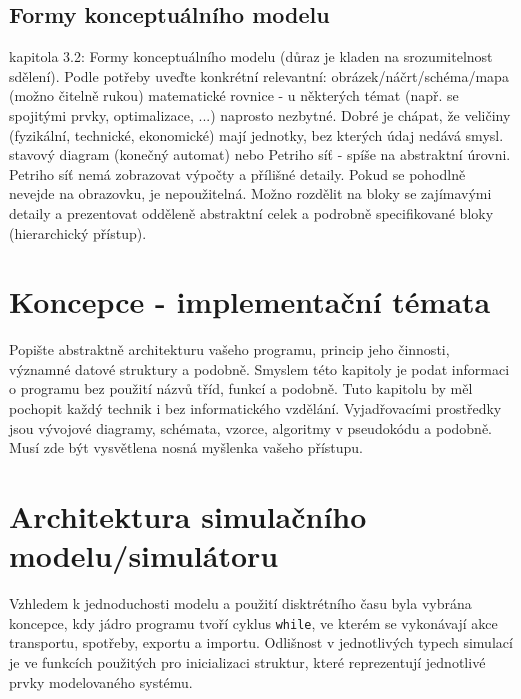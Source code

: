 \documentclass[a4paper,11pt]{article}
\begin{document}
\subsection{Formy konceptuálního modelu}
kapitola 3.2: Formy konceptuálního modelu (důraz je kladen na srozumitelnost sdělení). Podle potřeby uveďte konkrétní relevantní:
obrázek/náčrt/schéma/mapa (možno čitelně rukou)
matematické rovnice - u některých témat (např. se spojitými prvky, optimalizace, ...) naprosto nezbytné. Dobré je chápat, že veličiny (fyzikální, technické, ekonomické) mají jednotky, bez kterých údaj nedává smysl.
stavový diagram (konečný automat) nebo Petriho síť - spíše na abstraktní úrovni. Petriho síť nemá zobrazovat výpočty a přílišné detaily. Pokud se pohodlně nevejde na obrazovku, je nepoužitelná. Možno rozdělit na bloky se zajímavými detaily a prezentovat odděleně abstraktní celek a podrobně specifikované bloky (hierarchický přístup).

\section{Koncepce - implementační témata}

Popište abstraktně architekturu vašeho programu, princip jeho činnosti, významné datové struktury a podobně. Smyslem této kapitoly je podat informaci o programu bez použití názvů tříd, funkcí a podobně. Tuto kapitolu by měl pochopit každý technik i bez informatického vzdělání. Vyjadřovacími prostředky jsou vývojové diagramy, schémata, vzorce, algoritmy v pseudokódu a podobně. Musí zde být vysvětlena nosná myšlenka vašeho přístupu.


\section{Architektura simulačního modelu/simulátoru}


Vzhledem k jednoduchosti modelu a použití
disktrétního času byla vybrána koncepce,
kdy jádro programu tvoří cyklus \texttt{while}, ve kterém se
vykonávají akce transportu, spotřeby, exportu a importu.
Odlišnost v jednotlivých typech simulací je ve funkcích
použitých pro inicializaci struktur, které reprezentují
jednotlivé prvky modelovaného systému.
\end{document}
